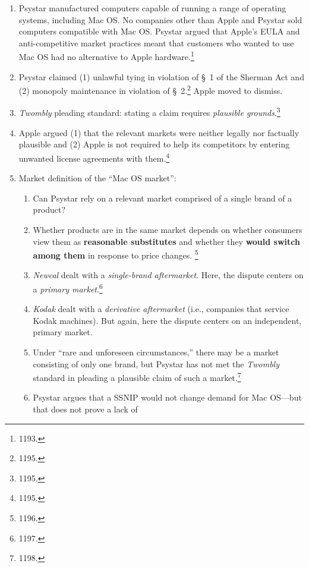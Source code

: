 \begin{enumerate}
    \item Psystar manufactured computers capable of running a range of 
    operating systems, including Mac OS. No companies other than Apple and 
    Psystar sold computers compatible with Mac OS. Psystar argued that Apple's 
    EULA and anti-competitive market practices meant that customers who wanted 
    to use Mac OS had no alternative to Apple hardware.\footnote{1193.}
    \item Psystar claimed (1) unlawful tying in violation of \S\ 1 of the 
    Sherman Act and (2) monopoly maintenance in violation of \S\ 
    2.\footnote{1195.} Apple moved to dismiss.
    \item \emph{Twombly} pleading standard: stating a claim requires 
    \emph{plausible grounds}.\footnote{1195.}
    \item Apple argued (1) that the relevant markets were neither legally nor 
    factually plausible and (2) Apple is not required to help its competitors 
    by entering unwanted license agreements with them.\footnote{1195.}
    \item Market definition of the ``Mac OS market'':
    \begin{enumerate}
        \item Can Psystar rely on a relevant market comprised of a single 
        brand of a product?
        \item Whether products are in the same market depends on whether 
        consumers view them as \textbf{reasonable substitutes} and whether 
        they \textbf{would switch among them} in response to price changes. 
        \footnote{1196.}
        \item \emph{Newcal} dealt with a \emph{single-brand aftermarket}. 
        Here, the dispute centers on a \emph{primary market}.\footnote{1197.}
        \item \emph{Kodak} dealt with a \emph{derivative aftermarket} (i.e., 
        companies that service Kodak machines). But again, here the dispute 
        centers on an independent, primary market.
        \item Under ``rare and unforeseen circumstances,'' there may be a 
        market consisting of only one brand, but Psystar has not met the 
        \emph{Twombly} standard in pleading a plausible claim of such a 
        market.\footnote{1198.}
        \item Psystar argues that a SSNIP would not change demand for Mac 
        OS---but that does not prove a lack of 

\end{enumerate}
\end{enumerate}
